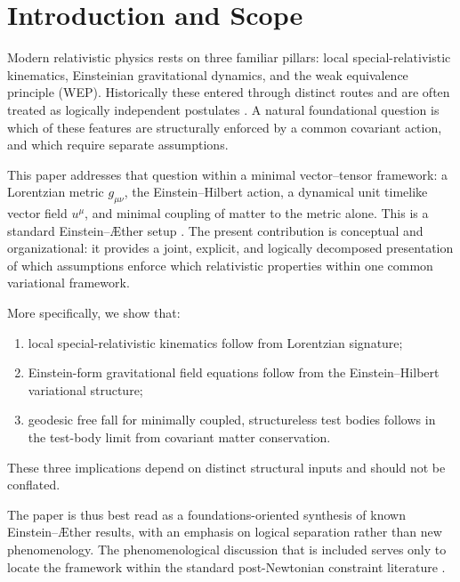 \documentclass[12pt,a4paper]{article}
\newcommand{\AEther}{\AE{}ther}
\begin{document}
    
    \section{Introduction and Scope}
        \label{sec:intro}
        
        Modern relativistic physics rests on three familiar pillars: local
        special-relativistic kinematics, Einsteinian gravitational dynamics, and the
        weak equivalence principle (WEP). Historically these entered through distinct
        routes and are often treated as logically independent postulates
        \cite{einstein1905,einstein1915,will2014}. A natural foundational question is
        which of these features are structurally enforced by a common covariant action,
        and which require separate assumptions.
        
        This paper addresses that question within a minimal vector--tensor framework:
        a Lorentzian metric $g_{\mu\nu}$, the Einstein--Hilbert action, a dynamical
        unit timelike vector field $u^\mu$, and minimal coupling of matter to the
        metric alone. This is a standard Einstein--\AEther{} setup
        \cite{jacobson2001,jacobson2008}. The present contribution is conceptual and
        organizational: it provides a joint, explicit, and logically decomposed
        presentation of which assumptions enforce which relativistic properties within
        one common variational framework.
        
        More specifically, we show that:
        \begin{enumerate}[label=(\roman*),noitemsep]
\item local special-relativistic kinematics follow from Lorentzian signature;
\item Einstein-form gravitational field equations follow from the
Einstein--Hilbert variational structure;
\item geodesic free fall for minimally coupled, structureless test bodies
follows in the test-body limit from covariant matter conservation.
        \end{enumerate}
        These three implications depend on distinct structural inputs and should not be
        conflated.
        
        The paper is thus best read as a foundations-oriented synthesis of known
        Einstein--\AEther{} results, with an emphasis on logical separation rather than
        new phenomenology. The phenomenological discussion that is included serves only
        to locate the framework within the standard post-Newtonian constraint
        literature \cite{foster2006,will2014}.
    
\end{document}
